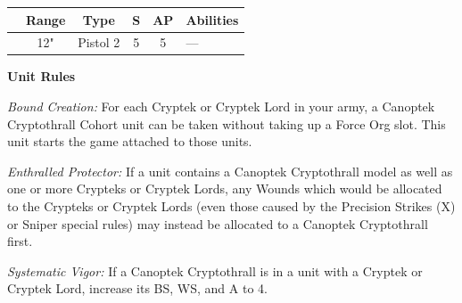 \begin{minipage}[t]{0.72\textwidth}
	\begin{tabular}{m{95 pt} *{4}{c} >{\raggedright\arraybackslash}p{130pt}}
		& Range & Type & S & AP & Abilities \\
		\hline
		\quickref{Scouring Eye} & 12" & Pistol 2 & 5 & 5 & — \\
	\end{tabular}
	
	\vspace*{2em}
	\textbf{Unit Rules}
	
	\textit{Bound Creation:} For each Cryptek or Cryptek Lord in your army, a Canoptek Cryptothrall Cohort unit can be taken without taking up a Force Org slot. This unit starts the game attached to those units.
	
	\textit{Enthralled Protector:} If a unit contains a Canoptek Cryptothrall model as well as one or more Crypteks or Cryptek Lords, any Wounds which would be allocated to the Crypteks or Cryptek Lords (even those caused by the Precision Strikes (X) or Sniper special rules) may instead be allocated to a Canoptek Cryptothrall first.
	
	\textit{Systematic Vigor:} If a Canoptek Cryptothrall is in a unit with a Cryptek or Cryptek Lord, increase its BS, WS, and A to 4.
\end{minipage}
\hspace{0.5em}


\newpage
